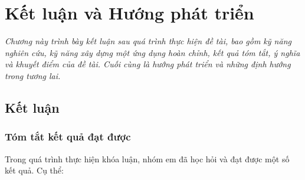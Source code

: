 \chapter{Kết luận và Hướng phát triển}
\label{Chapter7}

\emph{Chương này trình bày kết luận sau quá trình thực hiện đề tài, bao gồm kỹ năng nghiên cứu, kỹ năng xây dựng một ứng dụng hoàn chỉnh, kết quả tóm tắt, ý nghĩa và khuyết điểm của đề tài. Cuối cùng là hướng phát triển và những định hướng trong tương lai.}

\section{Kết luận}
\label{sec:ket-luan}

\subsection{Tóm tắt kết quả đạt được}

Trong quá trình thực hiện khóa luận, nhóm em đã học hỏi và đạt được một số kết quả. Cụ thể:

